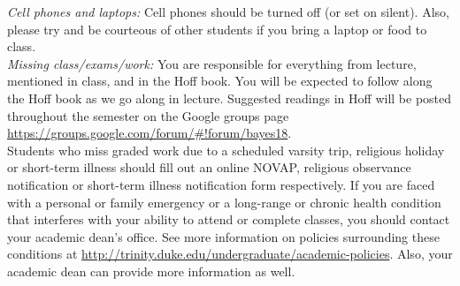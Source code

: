 \documentclass[11pt]{article}
\begin{document}
%
%

\emph{Cell phones and laptops:} Cell phones should be turned off (or set on silent). Also, please try and be courteous of other students if you bring a laptop or food to class. \\


\emph{Missing class/exams/work:}
You are responsible for everything from lecture, mentioned in class, and in the Hoff book. You will be expected to follow along the Hoff book as we go along in lecture. Suggested readings in Hoff will be posted throughout the semester on the Google groups page \url{https://groups.google.com/forum/#!forum/bayes18}.  \\

Students who miss graded work due to a scheduled varsity trip, religious holiday or short-term illness should fill out an online NOVAP, religious observance notification or short-term illness notification form respectively. If you are faced with a personal or family emergency or a long-range or chronic health condition that interferes with your ability to attend or complete classes, you should contact your academic dean's office. See more information on policies surrounding these conditions at \url{http://trinity.duke.edu/undergraduate/academic-policies}. Also, your academic dean can provide more information as well.\\
\end{document}

